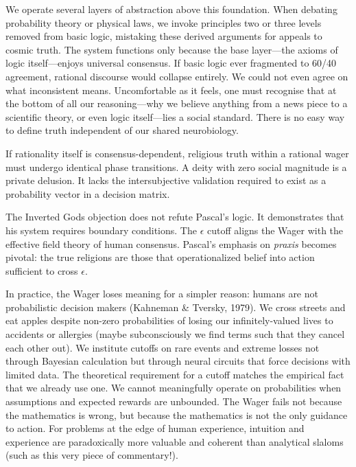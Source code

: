\begin{commentary}
We operate several layers of abstraction above this foundation. When debating probability theory or physical laws, we invoke principles two or three levels removed from basic logic, mistaking these derived arguments for appeals to cosmic truth. The system functions only because the base layer—the axioms of logic itself—enjoys universal consensus. If basic logic ever fragmented to 60/40 agreement, rational discourse would collapse entirely. We could not even agree on what \QSOpen{}inconsistent\QSClose{} means. Uncomfortable as it feels, one must recognise that at the bottom of all our reasoning—why we believe anything from a news piece to a scientific theory, or even logic itself—lies a social standard. There is no easy way to define truth independent of our shared neurobiology.

If rationality itself is consensus-dependent, religious truth within a rational wager must undergo identical phase transitions. A deity with zero social magnitude is a private delusion. It lacks the intersubjective validation required to exist as a probability vector in a decision matrix.

The \QSOpen{}Inverted Gods\QSClose{} objection does not refute Pascal's logic. It demonstrates that his system requires boundary conditions. The $\epsilon$ cutoff aligns the Wager with the effective field theory of human consensus. Pascal's emphasis on \emph{praxis} becomes pivotal: the \QSOpen{}true\QSClose{} religions are those that operationalized belief into action sufficient to cross $\epsilon$.

In practice, the Wager loses meaning for a simpler reason: humans are not probabilistic decision makers (Kahneman \& Tversky, 1979). We cross streets and eat apples despite non-zero probabilities of losing our infinitely-valued lives to accidents or allergies (maybe subconsciously we find terms such that they cancel each other out). We institute cutoffs on rare events and extreme losses not through Bayesian calculation but through neural circuits that force decisions with limited data. The theoretical requirement for a cutoff matches the empirical fact that we already use one. We cannot meaningfully operate on probabilities when assumptions and expected rewards are unbounded. The Wager fails not because the mathematics is wrong, but because the mathematics is not the only guidance to action. For problems at the edge of human experience, intuition and experience are paradoxically more valuable and coherent than analytical slaloms (such as this very piece of commentary!).

\end{commentary}